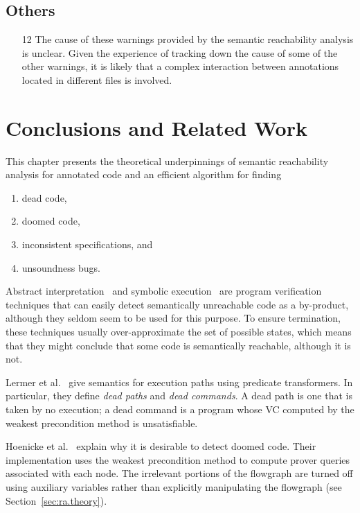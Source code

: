 \documentclass[a4paper]{article}
\theoremstyle{slanted}
\theoremstyle{definition}
\theoremstyle{remark}
\begin{document}
\subsection{Others}

\begin{itemize}
\item[12] 
  The cause of these warnings provided by the semantic
  reachability analysis is unclear. Given the experience of
  tracking down the cause of some of the other warnings, it is
  likely that a complex interaction between annotations located
  in different files is involved.
\end{itemize}
\section{Conclusions and Related Work}
\label{sec:ra.conclusions}

This chapter presents the theoretical underpinnings of semantic
reachability analysis for annotated code and an efficient
algorithm for finding 
\begin{enumerate}
\item dead code,
\item doomed code,
\item inconsistent specifications, and
\item unsoundness bugs.
\end{enumerate}


Abstract interpretation~\cite{cousot1977} and symbolic
execution~\cite{king1976} are program verification techniques
that can easily detect semantically unreachable code as a
by-product, although they seldom seem to be used for this
purpose. To ensure termination, these techniques usually
over-approximate the set of possible states, which means that
they might conclude that some code is semantically reachable,
although it is not.

Lermer et al.~\cite{lermer2003} give semantics for execution
paths using predicate transformers. In particular, they define
\emph{dead paths} and \emph{dead commands}. A dead path is one
that is taken by no execution; a dead command is a program whose
VC computed by the weakest precondition method is unsatisfiable.


Hoenicke et al.~\cite{hoenicke2009} explain why it is desirable
to detect doomed code. Their implementation uses the weakest
precondition method to compute prover queries associated with
each node. The irrelevant portions of the flowgraph are turned
off using auxiliary variables rather than explicitly manipulating
the flowgraph (see Section~\ref{sec:ra.theory}).
\end{document}
